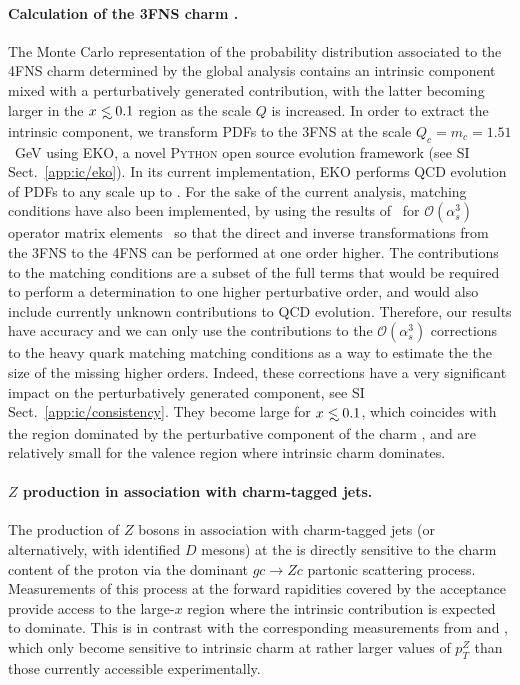 \paragraph{Calculation of the 3FNS charm \pdf.}
%
The Monte Carlo representation of the probability distribution associated to
the 4FNS charm \pdf determined by the global
analysis contains an intrinsic component mixed with a perturbatively
generated contribution, with the latter
becoming larger in the $x\lsim 0.1$ region as the scale $Q$ is increased.
%
In order to extract the intrinsic component, 
we transform PDFs to the 3FNS at the scale $Q_c=m_c=1.51$~GeV using
\textsc{\small EKO}, a novel \textsc{\small Python} open source
\pdf evolution framework (see  SI Sect.~\ref{app:ic/eko}).
%
In its current implementation, \textsc{\small EKO} performs  QCD 
evolution of PDFs to any scale
up to \nnlo. For
the sake of the current analysis, \nnnlo matching conditions have also
been implemented, by 
using  the results
of~\cite{Bierenbaum:2009zt,Bierenbaum:2009mv,Ablinger:2010ty,Ablinger:2014vwa,Ablinger:2014uka,Behring:2014eya,Ablinger_2014,Ablinger:2014nga,Blumlein:2017wxd}
for $\mathcal{O}(\alpha_s^3)$ operator matrix elements~
so that the direct and inverse transformations from the 3FNS to the
4FNS can be performed at one order
higher.
%
The \nnnlo contributions to the matching conditions are a subset of
the full \nnnlo terms that would be required to perform a \pdf determination
 to one higher perturbative order, and would
also include currently unknown
\nnnlo contributions to QCD evolution. Therefore, our results have 
\nnlo accuracy and we can only use the  \nnnlo contributions to the
 $\mathcal{O}(\alpha_s^3)$ corrections to the
heavy quark matching
matching conditions as a way to estimate the 
the size of the missing higher orders. 
Indeed, these corrections have a very 
significant impact on the
perturbatively generated component, see SI Sect.~\ref{app:ic/consistency}.
%
They become large for $x \lsim 0.1$, which coincides with the region
dominated by the perturbative component of the charm \pdf,
  and are relatively small for the valence region
  where intrinsic charm dominates.
  
\paragraph{$Z$ production in association with charm-tagged jets.}
%
The production of $Z$ bosons in association with charm-tagged jets (or alternatively,
with identified $D$ mesons) at the \lhc is directly sensitive to the charm content
of the proton via the dominant $gc \to Zc$ partonic scattering process.
%
Measurements of this process at  the forward rapidities covered by the
\lhcb acceptance provide access to the large-$x$ region where the intrinsic 
contribution is expected to dominate.
%
This is in contrast with the corresponding measurements from \atlas and \cms,
which only become sensitive to intrinsic charm
at rather larger values of $p_T^Z$ than those
currently accessible experimentally.

